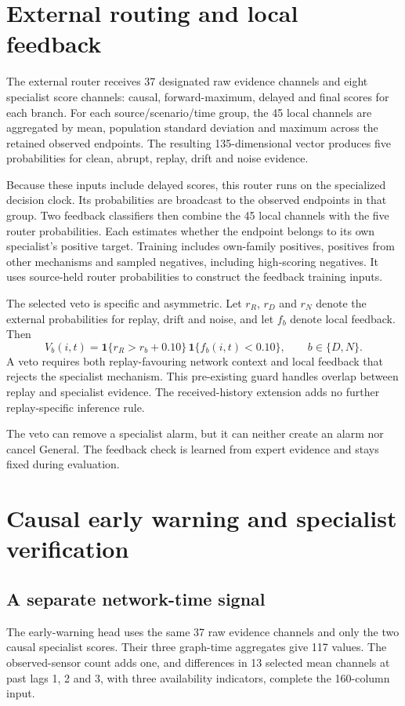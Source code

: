 \section{External routing and local feedback}
The external router receives 37 designated raw evidence channels and eight specialist score channels: causal, forward-maximum, delayed and final scores for each branch. For each source/scenario/time group, the 45 local channels are aggregated by mean, population standard deviation and maximum across the retained observed endpoints. The resulting 135-dimensional vector produces five probabilities for clean, abrupt, replay, drift and noise evidence.

Because these inputs include delayed scores, this router runs on the specialized decision clock. Its probabilities are broadcast to the observed endpoints in that group. Two feedback classifiers then combine the 45 local channels with the five router probabilities. Each estimates whether the endpoint belongs to its own specialist's positive target. Training includes own-family positives, positives from other mechanisms and sampled negatives, including high-scoring negatives. It uses source-held router probabilities to construct the feedback training inputs.

The selected veto is specific and asymmetric. Let $r_R$, $r_D$ and $r_N$ denote the external probabilities for replay, drift and noise, and let $f_b$ denote local feedback. Then
\begin{equation}
 V_b(i,t)=\mathbf1\{r_R>r_b+0.10\}\,
          \mathbf1\{f_b(i,t)<0.10\},\qquad b\in\{D,N\}.
 \label{eq:veto}
\end{equation}
A veto requires both replay-favouring network context and local feedback that rejects the specialist mechanism. This pre-existing guard handles overlap between replay and specialist evidence. The received-history extension adds no further replay-specific inference rule.

The veto can remove a specialist alarm, but it can neither create an alarm nor cancel General. The feedback check is learned from expert evidence and stays fixed during evaluation.

\section{Causal early warning and specialist verification}
\subsection{A separate network-time signal}
The early-warning head uses the same 37 raw evidence channels and only the two causal specialist scores. Their three graph-time aggregates give 117 values. The observed-sensor count adds one, and differences in 13 selected mean channels at past lags 1, 2 and 3, with three availability indicators, complete the 160-column input.


